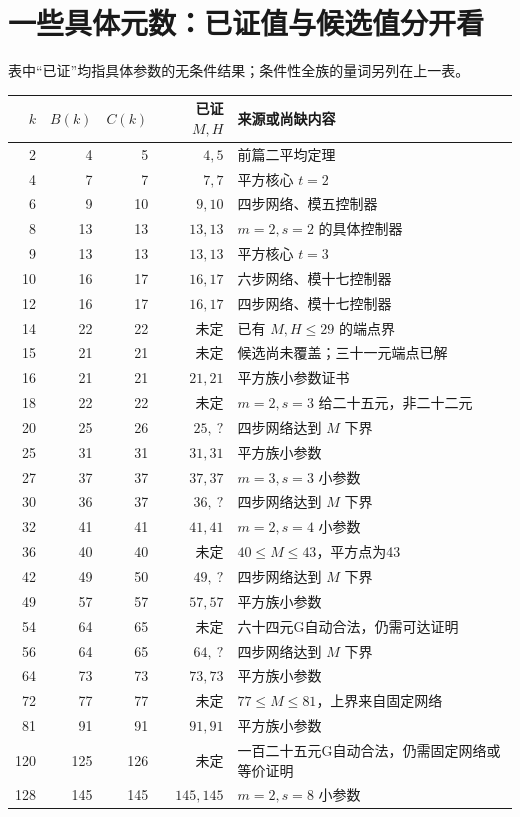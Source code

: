 \section{一些具体元数：已证值与候选值分开看}
表中“已证”均指具体参数的无条件结果；条件性全族的量词另列在上一表。
\begin{longtable}{rrrrp{}}
\toprule $k$&$B(k)$&$C(k)$&已证 $M,H$&来源或尚缺内容\\\midrule\endhead
2&4&5&$4,5$&前篇二平均定理\\
4&7&7&$7,7$&平方核心 $t=2$\\
6&9&10&$9,10$&四步网络、模五控制器\\
8&13&13&$13,13$&$m=2,s=2$ 的具体控制器\\
9&13&13&$13,13$&平方核心 $t=3$\\
10&16&17&$16,17$&六步网络、模十七控制器\\
12&16&17&$16,17$&四步网络、模十七控制器\\
14&22&22&未定&已有 $M,H\le29$ 的端点界\\
15&21&21&未定&候选尚未覆盖；三十一元端点已解\\
16&21&21&$21,21$&平方族小参数证书\\
18&22&22&未定&$m=2,s=3$ 给二十五元，非二十二元\\
20&25&26&$25,\ ?$&四步网络达到 $M$ 下界\\
25&31&31&$31,31$&平方族小参数\\
27&37&37&$37,37$&$m=3,s=3$ 小参数\\
30&36&37&$36,\ ?$&四步网络达到 $M$ 下界\\
32&41&41&$41,41$&$m=2,s=4$ 小参数\\
36&40&40&未定&$40\le M\le43$，平方点为43\\
42&49&50&$49,\ ?$&四步网络达到 $M$ 下界\\
49&57&57&$57,57$&平方族小参数\\
54&64&65&未定&六十四元G自动合法，仍需可达证明\\
56&64&65&$64,\ ?$&四步网络达到 $M$ 下界\\
64&73&73&$73,73$&平方族小参数\\
72&77&77&未定&$77\le M\le81$，上界来自固定网络\\
81&91&91&$91,91$&平方族小参数\\
120&125&126&未定&一百二十五元G自动合法，仍需固定网络或等价证明\\
128&145&145&$145,145$&$m=2,s=8$ 小参数\\
\bottomrule
\end{longtable}


